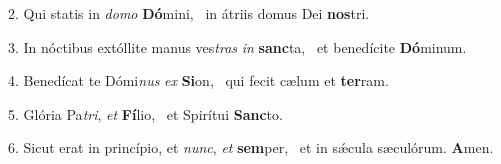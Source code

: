 2. Qui statis in \textit{do}\textit{mo} \textbf{Dó}mini, \ast\  in átriis domus Dei \textbf{nos}tri.\

3. In nóctibus extóllite manus ves\textit{tras} \textit{in} \textbf{sanc}ta, \ast\  et benedícite \textbf{Dó}minum.\

4. Benedícat te Dómi\textit{nus} \textit{ex} \textbf{Si}on, \ast\  qui fecit cælum et \textbf{ter}ram.\

5. Glória Pa\textit{tri}, \textit{et} \textbf{Fí}lio, \ast\  et Spirítui \textbf{Sanc}to.\

6. Sicut erat in princípio, et \textit{nunc}, \textit{et} \textbf{sem}per, \ast\  et in sǽcula sæculórum. \textbf{A}men.\

